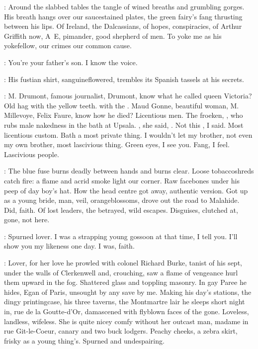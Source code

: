 \StephenInt:
Around the slabbed tables
the tangle of wined breaths and grumbling gorges.
His breath hangs over our saucestained plates,
the green fairy's fang thrusting between his lips.
Of Ireland, the Dalcassians,
of hopes, conspiracies,
of Arthur Griffith now,
A~E,
pimander, good shepherd of men.
To yoke me as his yokefellow,
our crimes our common cause.

\kevin:
You're your father's son.
I know the voice.

\StephenInt:
His fustian shirt, sanguineflowered,
trembles its Spanish tassels at his secrets.

\kevin:
M. Drumont, famous journalist, Drumont,
know what he called queen Victoria?
Old hag with the yellow teeth.
 with the .
Maud Gonne, beautiful woman,
M. Millevoye,
Felix Faure, know how he died?
Licentious men.
The froeken, ,
who rubs male nakedness in the bath at Upsala.
, she said, .
Not this , I said.
Most licentious custom.
Bath a most private thing.
I wouldn't let my brother, not even my own brother,
most lascivious thing.
Green eyes, I see you.
Fang, I feel.
Lascivious people.

\StephenInt:
The blue fuse burns deadly between hands and burns clear.
Loose tobaccoshreds catch fire:
a flame and acrid smoke light our corner.
Raw facebones under his peep of day boy's hat.
How the head centre got away,
authentic version.
Got up as a young bride,
man, veil, orangeblossoms,
drove out the road to Malahide.
Did, faith.
Of lost leaders, the betrayed, wild escapes.
Disguises, clutched at, gone, not here.

\kevin:
Spurned lover.
I was a strapping young gossoon at that time, I tell you.
I'll show you my likeness one day.
I was, faith.

\StephenInt:
Lover,
for her love
he prowled with colonel Richard Burke,
tanist of his sept,
under the walls of Clerkenwell
and, crouching,
saw a flame of vengeance hurl them upward in the fog.
Shattered glass and toppling masonry.
In gay Paree he hides,
Egan of Paris,
unsought by any save by me.
Making his day's stations,
the dingy printingcase,
his three taverns,
the Montmartre lair he sleeps short night in,
rue de la Goutte-d'Or,
damascened with flyblown faces of the gone.
Loveless, landless, wifeless.
She is quite nicey comfy without her outcast man,
madame in rue Git-le-Coeur,
canary and two buck lodgers.
Peachy cheeks, a zebra skirt, frisky as a young thing's.
Spurned and undespairing.

